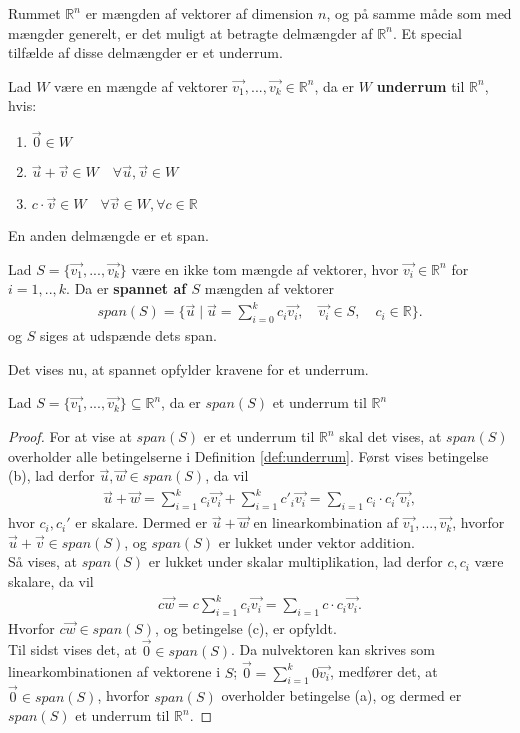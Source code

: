 Rummet $\mathds{R}^n$ er mængden af vektorer af dimension $n$, og på samme måde som med mængder generelt, er det muligt at betragte delmængder af $\mathds{R}^n$.
Et special tilfælde af disse delmængder er et underrum.
\begin{defn}[Underrum]
Lad $W$ være en mængde af vektorer $\vec{v_1},...,\vec{v_k} \in \mathds{R}^n$, da er $W$  \textbf{underrum} til $\mathds{R}^n$, hvis:
\begin{enumerate}[label=\alph*]
\item $\vec{0} \in W$
\item $\vec{u}+\vec{v} \in W \quad \forall \vec{u}, \vec{v} \in W$
\item $c \cdot \vec{v} \in W \quad \forall \vec{v} \in W, \forall c \in \mathds{R}$
\end{enumerate}
\label{def:underrum}
\end{defn}
En anden delmængde er et span.
\begin{defn}[Span]
Lad $S=\{\vec{v_1},...,\vec{v_k}\}$ være en ikke tom mængde af vektorer, hvor $\vec{v_i} \in \mathds{R}^n$ for $i = 1,..,k$. 
Da er \textbf{spannet af $S$} mængden af vektorer
\begin{align*}
span(S) = \{\vec{u} \mid \vec{u}=\sum_{i=0}^k c_i \vec{v_i}, \quad \vec{v_i} \in S, \quad c_i \in \mathds{R}\}.
\end{align*} 
og $S$ siges at udspænde dets span.
\label{def:span}
\end{defn}
Det vises nu, at spannet opfylder kravene for et underrum.
\begin{stn}
Lad $S=\{\vec{v_1},...,\vec{v_k}\} \subseteq \mathds{R}^n$, da er $span(S)$ et underrum til $\mathds{R}^n$
\label{stn:spanunderrum}
\end{stn}
\begin{proof}
For at vise at $span(S)$ er et underrum til $\mathds{R}^n$ skal det vises, at $span(S)$ overholder alle betingelserne i Definition \ref{def:underrum}.
Først vises betingelse (b), lad  derfor $\vec{u}, \vec{w} \in span(S)$, da vil 
\begin{align*}
\vec{u}+\vec{w}= \sum_{i=1}^k c_i \vec{v_i} + \sum_{i=1}^k c'_i \vec{v_i} = \sum_{i=1} c_i\cdot c_i' \vec{v_i},
\end{align*}
hvor $c_i, c_i'$ er skalare.
Dermed er $\vec{u}+\vec{w}$ en linearkombination af $\vec{v_1},...,\vec{v_k}$, hvorfor $\vec{u}+\vec{v} \in span(S)$, og $span(S)$ er lukket under vektor addition.
\\ Så vises, at $span(S)$ er lukket under skalar multiplikation, lad derfor $c, c_i$ være skalare, da vil
\begin{align*}
c\vec{w}= c\sum_{i=1}^k c_i \vec{v_i}  = \sum_{i=1} c \cdot c_i \vec{v_i}.
\end{align*}
Hvorfor $c\vec{w} \in span(S)$, og betingelse (c), er opfyldt.
\\Til sidst vises det, at $\vec{0} \in span(S)$.
Da nulvektoren kan skrives som linearkombinationen af vektorene i $S$; $\vec{0} = \sum_{i=1}^k 0 \vec{v_i}$, medfører det, at $\vec{0} \in span(S)$, hvorfor $span(S)$ overholder betingelse (a), og dermed er $span(S)$ et underrum til $\mathds{R}^n$.
\end{proof}
